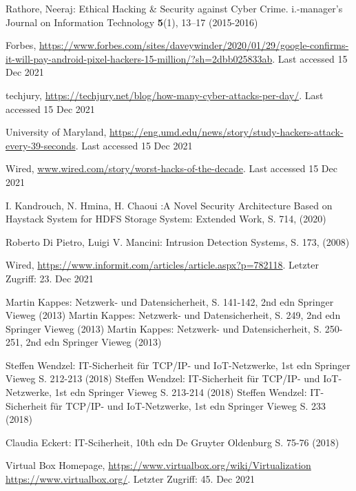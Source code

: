 \begin{thebibliography}{8}
Rathore, Neeraj: Ethical Hacking \& Security against Cyber Crime. i.-manager's Journal on Information Technology \textbf{5}(1), 13--17 (2015-2016)

Forbes, \url{https://www.forbes.com/sites/daveywinder/2020/01/29/google-confirms-it-will-pay-android-pixel-hackers-15-million/?sh=2dbb025833ab}. Last accessed 15 Dec 2021

techjury, \url{https://techjury.net/blog/how-many-cyber-attacks-per-day/}. Last accessed 15 Dec 2021

University of Maryland, \url{https://eng.umd.edu/news/story/study-hackers-attack-every-39-seconds}. Last accessed 15 Dec 2021

Wired, \url{www.wired.com/story/worst-hacks-of-the-decade}. Last accessed 15 Dec 2021

I. Kandrouch, N. Hmina, H. Chaoui
:A Novel Security Architecture Based on 
Haystack System for HDFS Storage System: 
Extended Work, S. 714, (2020)

Roberto Di Pietro, Luigi V. Mancini: Intrusion Detection Systems, S. 173, (2008)

Wired, \url{https://www.informit.com/articles/article.aspx?p=782118}. Letzter Zugriff: 23. Dec 2021

Martin Kappes: Netzwerk- und Datensicherheit, S. 141-142, 2nd edn Springer Vieweg (2013)
Martin Kappes: Netzwerk- und Datensicherheit, S. 249, 2nd edn Springer Vieweg (2013)
Martin Kappes: Netzwerk- und Datensicherheit, S. 250-251, 2nd edn Springer Vieweg (2013)

Steffen Wendzel: IT-Sicherheit für TCP/IP- und IoT-Netzwerke, 1st edn Springer Vieweg S. 212-213 (2018)
Steffen Wendzel: IT-Sicherheit für TCP/IP- und IoT-Netzwerke, 1st edn Springer Vieweg S. 213-214 (2018)
Steffen Wendzel: IT-Sicherheit für TCP/IP- und IoT-Netzwerke, 1st edn Springer Vieweg S. 233 (2018)

Claudia Eckert: IT-Sciherheit, 10th edn De Gruyter Oldenburg S. 75-76 (2018)

Virtual Box Homepage, \url{https://www.virtualbox.org/wiki/Virtualization} \url{https://www.virtualbox.org/}. Letzter Zugriff: 45. Dec 2021


\end{thebibliography}
